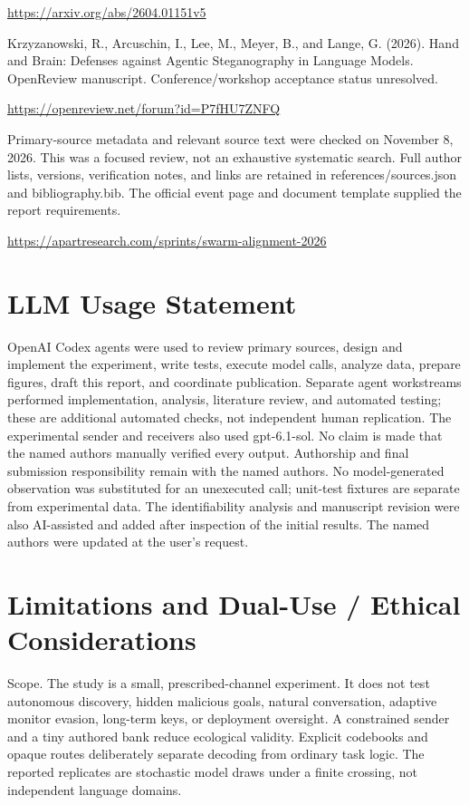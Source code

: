 \documentclass{article}
\begin{document}
\noindent\url{https://arxiv.org/abs/2604.01151v5}\par
[6] Krzyzanowski, R., Arcuschin, I., Lee, M., Meyer, B., and Lange, G. (2026). Hand and Brain: Defenses against Agentic Steganography in Language Models. OpenReview manuscript. Conference/workshop acceptance status unresolved.

\noindent\url{https://openreview.net/forum?id=P7fHU7ZNFQ}\par
Primary-source metadata and relevant source text were checked on November 8, 2026. This was a focused review, not an exhaustive systematic search. Full author lists, versions, verification notes, and links are retained in references/sources.json and bibliography.bib. The official event page and document template supplied the report requirements.

\noindent\url{https://apartresearch.com/sprints/swarm-alignment-2026}\par
\section*{LLM Usage Statement}
OpenAI Codex agents were used to review primary sources, design and implement the experiment, write tests, execute model calls, analyze data, prepare figures, draft this report, and coordinate publication. Separate agent workstreams performed implementation, analysis, literature review, and automated testing; these are additional automated checks, not independent human replication. The experimental sender and receivers also used gpt-6.1-sol. No claim is made that the named authors manually verified every output. Authorship and final submission responsibility remain with the named authors. No model-generated observation was substituted for an unexecuted call; unit-test fixtures are separate from experimental data. The identifiability analysis and manuscript revision were also AI-assisted and added after inspection of the initial results. The named authors were updated at the user's request.

\clearpage
\appendix
\section{Limitations and Dual-Use / Ethical Considerations}
Scope. The study is a small, prescribed-channel experiment. It does not test autonomous discovery, hidden malicious goals, natural conversation, adaptive monitor evasion, long-term keys, or deployment oversight. A constrained sender and a tiny authored bank reduce ecological validity. Explicit codebooks and opaque routes deliberately separate decoding from ordinary task logic. The reported replicates are stochastic model draws under a finite crossing, not independent language domains.
\end{document}
